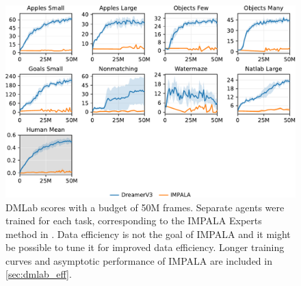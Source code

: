 \begin{figure}[h]
\centering
\includegraphics[width=1\linewidth]{dmlab/dmlab}
\caption{DMLab scores with a budget of 50M frames. Separate agents were trained for each task, corresponding to the IMPALA Experts method in \citet{espeholt2018impala}. Data efficiency is not the goal of IMPALA and it might be possible to tune it for improved data efficiency. Longer training curves and asymptotic performance of IMPALA are included in \cref{sec:dmlab_eff}.}
\label{fig:dmlab}
\end{figure}